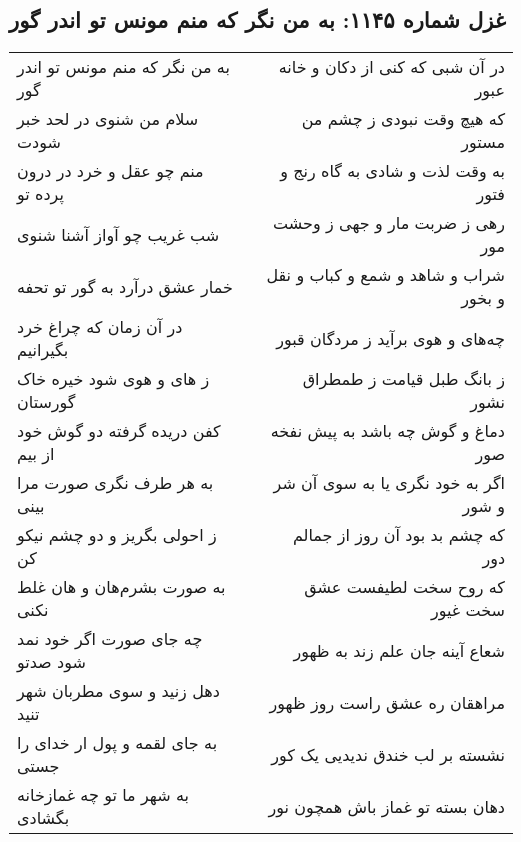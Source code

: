 \begin{center}
\section*{غزل شماره ۱۱۴۵: به من نگر که منم مونس تو اندر گور}
\label{sec:1145}
\begin{longtable}{l p{0.5cm} r}
به من نگر که منم مونس تو اندر گور
&&
در آن شبی که کنی از دکان و خانه عبور
\\
سلام من شنوی در لحد خبر شودت
&&
که هیچ وقت نبودی ز چشم من مستور
\\
منم چو عقل و خرد در درون پرده تو
&&
به وقت لذت و شادی به گاه رنج و فتور
\\
شب غریب چو آواز آشنا شنوی
&&
رهی ز ضربت مار و جهی ز وحشت مور
\\
خمار عشق درآرد به گور تو تحفه
&&
شراب و شاهد و شمع و کباب و نقل و بخور
\\
در آن زمان که چراغ خرد بگیرانیم
&&
چه‌های و هوی برآید ز مردگان قبور
\\
ز های و هوی شود خیره خاک گورستان
&&
ز بانگ طبل قیامت ز طمطراق نشور
\\
کفن دریده گرفته دو گوش خود از بیم
&&
دماغ و گوش چه باشد به پیش نفخه صور
\\
به هر طرف نگری صورت مرا بینی
&&
اگر به خود نگری یا به سوی آن شر و شور
\\
ز احولی بگریز و دو چشم نیکو کن
&&
که چشم بد بود آن روز از جمالم دور
\\
به صورت بشرم‌هان و هان غلط نکنی
&&
که روح سخت لطیفست عشق سخت غیور
\\
چه جای صورت اگر خود نمد شود صدتو
&&
شعاع آینه جان علم زند به ظهور
\\
دهل زنید و سوی مطربان شهر تنید
&&
مراهقان ره عشق راست روز ظهور
\\
به جای لقمه و پول ار خدای را جستی
&&
نشسته بر لب خندق ندیدیی یک کور
\\
به شهر ما تو چه غمازخانه بگشادی
&&
دهان بسته تو غماز باش همچون نور
\\
\end{longtable}
\end{center}
